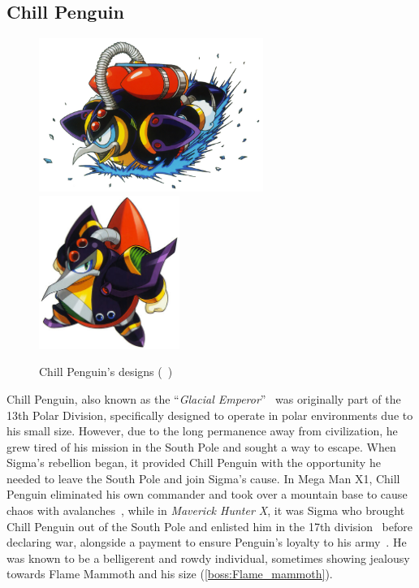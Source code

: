 \subsection{Chill Penguin}\label{boss:Chill_Penguin}
\begin{figure}[htp]
	\centering
	\includegraphics[height=5cm]{figures/X1/Chill_penguin/Chill_Penguin.jpg}
	\includegraphics[height=5cm]{figures/X1/Chill_penguin/MHXChillPenguin.jpg}
	\caption{Chill Penguin's designs (~\cite{book:MMX_Complete_art})}
\end{figure}

Chill Penguin, also known as the ``\textit{Glacial Emperor}''~\cite{book:MMX_Complete_art} was originally part of the 13th Polar Division, specifically designed to operate in polar environments due to his small size. However, due to the long permanence away from civilization, he grew tired of his mission in the South Pole and sought a way to escape. When Sigma's rebellion began, it provided Chill Penguin with the opportunity he needed to leave the South Pole and join Sigma's cause. In Mega Man X1, Chill Penguin eliminated his own commander and took over a mountain base to cause chaos with avalanches~\cite{Xcoll1:Manual_X1}, while in \textit{Maverick Hunter X}, it was Sigma who brought Chill Penguin out of the South Pole and enlisted him in the 17th division~\cite{MHX:manual} before declaring war, alongside a payment to ensure Penguin's loyalty to his army~\cite{wiki:MMX_script}. He  was known to be a belligerent and rowdy individual, sometimes showing jealousy towards Flame Mammoth and his size (\ref{boss:Flame_mammoth}).

